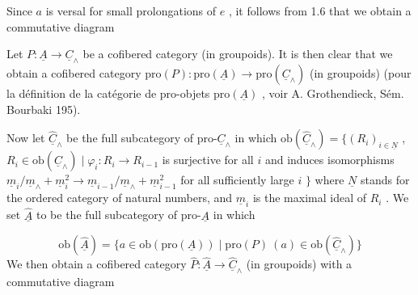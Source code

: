 \begin{center}
\end{center}
Since  $a$  is versal for small prolongations of  $e$  , it follows from 1.6 that we obtain a commutative diagram
Let  $P : \underline{A} \to \underline{C}_\wedge$  be a cofibered category (in groupoids). It is then clear that we obtain a cofibered category  $\mathrm{pro}(P) : \mathrm{pro}(\underline{A}) \to \mathrm{pro}(\underline{C}_\wedge)$  (in groupoids) (pour la définition de la catégorie de pro-objets  $\mathrm{pro}(\underline{A})$  , voir A. Grothendieck, Sém. Bourbaki 195).

\begin{center}
\end{center}
Now let  $\widehat{\underline{C}}_\wedge$  be the full subcategory of  pro-$\underline{C}_\wedge$  in which $\mathrm{ob}(\widehat{\underline{C}}_\wedge) = \{(R_i)_{i \in \underline{N}}$  ,  $R_i \in \mathrm{ob}(\underline{C}_\wedge) \mid \varphi_i : R_i \to R_{i-1}$  is surjective for all  $i$  and induces isomorphisms  $\underline{m}_i/\underline{m}_\wedge + \underline{m}_i^2 \to \underline{m}_{i-1}/\underline{m}_\wedge + \underline{m}_{i-1}^2$  for all sufficiently large  $i$  $\}$ where  $\underline{N}$  stands for the ordered category of natural numbers, and  $\underline{m}_i$  is the maximal ideal of  $R_i$  . We set  $\widehat{\underline{A}}$  to be the full subcategory of pro-$\underline{A}$  in which

\begin{equation*}
\mathrm{ob}(\widehat{\underline{A}}) = \{a \in \mathrm{ob}(\mathrm{pro}(\underline{A})) \mid \mathrm{pro}(P)\ (a) \in \mathrm{ob}(\widehat{\underline{C}}_\wedge)\}
\end{equation*}
We then obtain a cofibered category  $\widehat{P} : \widehat{\underline{A}} \to \widehat{\underline{C}}_\wedge$  (in groupoids) with a commutative diagram


